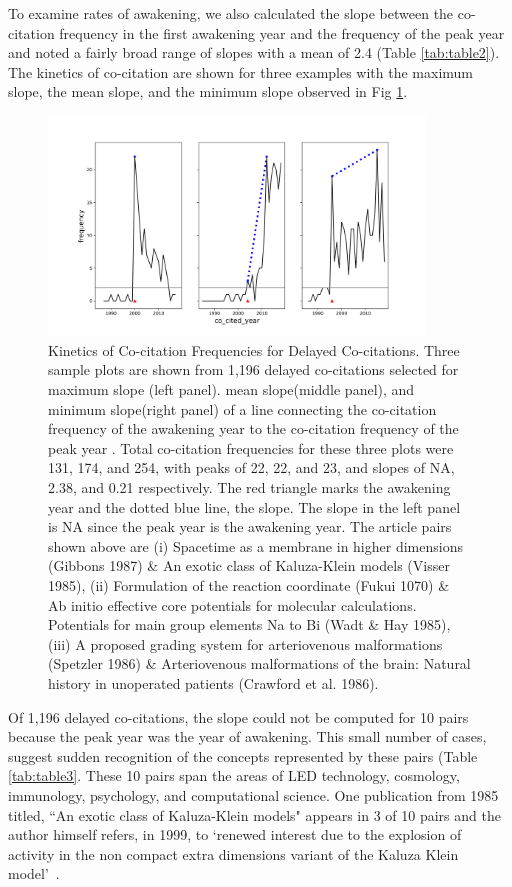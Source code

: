\documentclass[utf8]{frontiersSCNS}
\begin{document}
To examine rates of awakening, we also calculated the slope between the co-citation frequency in the first awakening year and the frequency of the peak year and noted a fairly broad range of slopes with a mean of 2.4 (Table \ref{tab:table2}). The kinetics of co-citation are shown for three examples with the maximum slope, the mean slope, and the minimum slope observed in Fig \ref{fig:fig2}.  
\begin{figure}[h!]
\begin{center}
\includegraphics[width=10cm]{fig3.png}%
\end{center}
\caption{Kinetics of Co-citation Frequencies for Delayed Co-citations. Three sample plots are shown from 1,196 delayed co-citations selected for maximum slope (left panel). mean slope(middle panel), and minimum slope(right panel) of a line connecting the co-citation frequency of the awakening year to the co-citation frequency of the peak year . Total co-citation frequencies for these three plots were 131, 174, and 254, with peaks of 22, 22, and 23, and slopes of NA, 2.38, and 0.21 respectively. The red triangle marks the awakening year and the dotted blue line, the slope. The slope in the left panel is NA since the peak year is the awakening year. The article pairs shown above are (i) Spacetime as a membrane in higher dimensions (Gibbons 1987) \& An exotic class of Kaluza-Klein models (Visser 1985), (ii) Formulation of the reaction coordinate (Fukui 1070) \& Ab initio effective core potentials for molecular calculations. Potentials for main group elements Na to Bi (Wadt \& Hay 1985), (iii) A proposed grading system for arteriovenous malformations (Spetzler 1986) \& Arteriovenous malformations of the brain: Natural history in unoperated patients (Crawford et al. 1986).}
\label{fig:fig2}
\end{figure}

Of 1,196 delayed co-citations, the slope could not be computed for 10 pairs because the peak year was the year of awakening. This small number of cases, suggest sudden recognition of the concepts represented by these pairs (Table \ref{tab:table3}. These 10 pairs span the areas of LED technology, cosmology, immunology, psychology, and computational science. One publication from 1985 titled, ``An exotic class of Kaluza-Klein models" appears in 3 of 10 pairs and the author himself refers, in 1999, to `renewed interest due to the explosion of activity in the non compact extra dimensions variant of the Kaluza Klein model'~\citep{visser_1999}.
\end{document}
